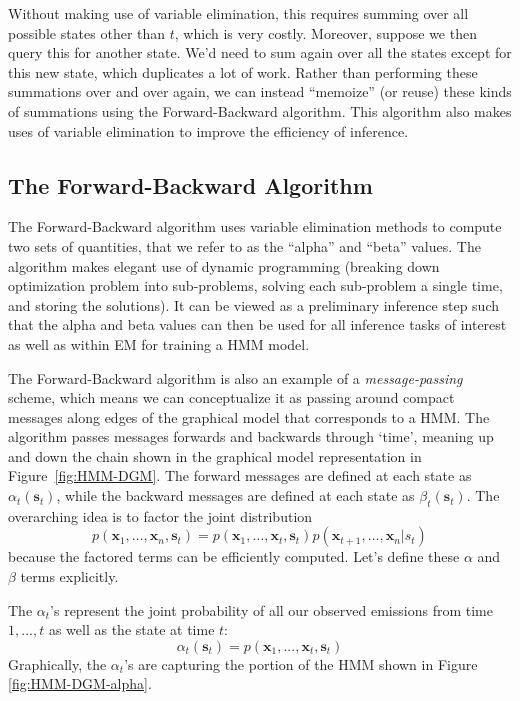Without making use of variable elimination, this requires summing over all possible states other than $t$, which is very costly.
%
Moreover, suppose we then query this for another state. We'd need to sum again over all the states except for this new state,
which duplicates a lot of work.
%
Rather than performing these summations over and over again, we can instead ``memoize'' (or reuse) these kinds of summations using the Forward-Backward algorithm. This  algorithm also makes uses of variable elimination to improve the efficiency of inference.

\subsection{ The Forward-Backward Algorithm}


The Forward-Backward algorithm uses variable elimination methods to compute two sets of quantities, that we refer to as the ``alpha'' and ``beta'' values. The algorithm makes elegant use of dynamic programming (breaking down optimization problem into sub-problems, solving each sub-problem a single time, and storing the solutions). It can be viewed as a preliminary inference step such that the alpha and beta values can then be used for all inference tasks of interest as well as within EM for training a HMM model.

The Forward-Backward algorithm is also an example of a \textit{message-passing} scheme, which means we can conceptualize it as passing around compact messages along edges of the graphical model that corresponds to a HMM.
%
The algorithm passes messages forwards and backwards through `time', meaning up and down the chain shown in the graphical model representation in Figure~\ref{fig:HMM-DGM}. The forward messages are defined at each state as $\alpha_t(\textbf{s}_t)$, while the backward messages are defined at each state as $\beta_t(\textbf{s}_t)$. The overarching idea is to factor the joint distribution $$p(\textbf{x}_1,\dots,\textbf{x}_n,\textbf{s}_t) = p(\textbf{x}_1,\dots,\textbf{x}_t,\textbf{s}_t) p(\textbf{x}_{t+1},\dots,\textbf{x}_n|s_t)$$ because the factored terms can be efficiently computed. Let's define these $\alpha$ and $\beta$ terms explicitly.

The $\alpha_t$'s represent the joint probability of all our observed emissions from time $1,...,t$ as well as the state at time $t$:
%
\begin{equation} \label{unfactorized-alphas}
	\alpha_t(\textbf{s}_t) = p(\textbf{x}_1, ..., \textbf{x}_t, \textbf{s}_t)
\end{equation}
Graphically, the $\alpha_t$'s are capturing the portion of the HMM  shown in Figure \ref{fig:HMM-DGM-alpha}.


